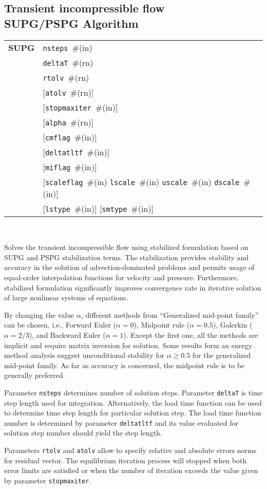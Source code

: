 \documentclass[a4paper]{article}
\makeatletter
\newcommand{\param}[1]{\texttt{#1}} %
\newcommand{\optional}[1]{[#1]} %
\newcommand{\field}[2]{\param{#1}~\#{\tiny(#2)}} %
\newcommand{\optField}[2]{\optional{\field{#1}{#2}}}
\newcommand{\entKeywordInst}[1]{\textbf{#1}} %
\newenvironment{record}[1][]{\begin{tabular}{|ll}}{\end{tabular}\\}
\newcommand{\recentry}[2]{{#1}&{#2}\\}
\newcounter{rcc}
\newenvironment{record}[1][\textwidth]{\setcounter{rcc}{0}\begin{tabular*}{#1}{|ll@{\extracolsep{\fill}}r}}{\end{tabular*}\\}
\newcommand{\recentry}[2]{\ifthenelse{\value{rcc}>0}{&$\backslash$ \\}{\setcounter{rcc}{1}}{#1}&{#2}}
\makeatother
\begin{document}
\subsection{Transient incompressible flow\\SUPG/PSPG Algorithm}
\label{supgIncomp}
\begin{record}
  \recentry{\entKeywordInst{SUPG}}{\field{nsteps}{in}}
  \recentry{}{\field{deltaT}{rn}}
  \recentry{}{\field{rtolv}{rn}}
  \recentry{}{\optField{atolv}{rn}}
  \recentry{}{\optField{stopmaxiter}{in}}
  \recentry{}{\optField{alpha}{rn}}
  \recentry{}{\optField{cmflag}{in}}
  \recentry{}{\optField{deltatltf}{in}}
  \recentry{}{\optField{miflag}{in}}
  \recentry{}{\optional{\field{scaleflag}{in} \field{lscale}{in} \field{uscale}{in} \field{dscale}{in}}}
  \recentry{}{\optField{lstype}{in} \optField{smtype}{in}}
\end{record}

Solves the transient incompressible flow using stabilized formulation
based on SUPG and PSPG
stabilization terms. The stabilization provides
stability and accuracy in the solution of
advection-dominated problems and permits usage of equal-order
interpolation functions for velocity and pressure. Furthermore,
stabilized formulation significantly improves convergence rate in
iterative solution of large nonlinear systems of equations.

By changing the value $\alpha$, different methods from
``Generalized mid-point family'' can be chosen, i.e.,
Forward Euler ($\alpha=0$), Midpoint rule ($\alpha=0.5$),
 Galerkin ($\alpha=2/3$), and  Backward Euler ($\alpha=1$). Except
the first one, all the methods are implicit and require matrix inversion for solution.
Some results form an energy method analysis suggest unconditional
stability for $\alpha\ge 0.5$ for the generalized mid-point family. As
far as accuracy is concerned, the midpoint rule is to be generally preferred.

Parameter \param{nsteps} determines number of solution
steps. Parameter \param{deltaT} is time step length used for
integration. Alternatively, the load time function can be used to
determine time step length for particular solution step. The load time
function number is determined by parameter \param{deltatltf} and its
value evaluated for solution step number should yield the step length.

Parameters \param{rtolv} and \param{atolv} allow to
specify relative and absolute errors norms for residual vector.
The equilibrium iteration process will stopped when both error limits
are satisfied or when the number of iteration exceeds the value given
by parameter \param{stopmaxiter}.
\end{document}
